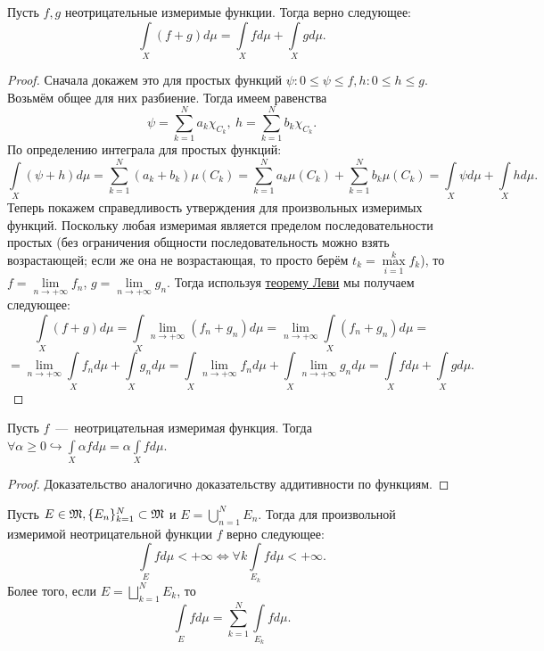 \begin{proposition}
    Пусть $f, g$ неотрицательные измеримые функции. Тогда верно следующее: \[\int\limits_X (f + g) d\mu = \int\limits_X fd\mu + \int\limits_X gd\mu.\]
\end{proposition}
\begin{proof}
    Сначала докажем это для простых функций $\psi: 0 \leq \psi \leq f, h: 0 \leq h \leq g$. Возьмём общее для них разбиение. Тогда имеем равенства \[\psi = \sum\limits_{k = 1}^N a_k \chi_{C_k}, \ h = \sum\limits_{k = 1}^N b_k \chi_{C_k}.\]
    По определению интеграла для простых функций: \[\int\limits_X (\psi + h)d\mu = \sum\limits_{k = 1}^N (a_k + b_k)\mu(C_k) = \sum\limits_{k = 1}^N a_k\mu(C_k) + \sum\limits_{k = 1}^N b_k\mu(C_k) = \int\limits_X \psi d\mu + \int\limits_X h d\mu.\]
    Теперь покажем справедливость утверждения для произвольных измеримых функций. Поскольку любая измеримая является пределом последовательности простых (без ограничения общности последовательность можно взять возрастающей; если же она не возрастающая, то просто берём $t_k = \max\limits_{i = 1}^k f_k$), то $f = \lim\limits_{n\rightarrow +\infty} f_n$, $g = \lim\limits_{n \rightarrow +\infty} g_n$. Тогда используя \hyperlink{beppo_levi}{теорему Леви} мы получаем следующее:     
    \[\int\limits_X (f + g)d\mu = \int\limits_X \lim\limits_{n\rightarrow +\infty} (f_n + g_n) d\mu = \lim\limits_{n \rightarrow + \infty} \int\limits_X (f_n + g_n)d\mu = \]\[ = \lim\limits_{n\rightarrow +\infty} \int\limits_X f_nd\mu + \int\limits_X g_nd\mu = \int\limits_X \lim\limits_{n \rightarrow +\infty} f_nd\mu + \int\limits_X \lim\limits_{n \rightarrow +\infty} g_nd\mu = \int\limits_X fd\mu + \int\limits_X gd\mu.\]
\end{proof}
\begin{proposition}
    Пусть $f$~---~неотрицательная измеримая функция. Тогда $\forall \alpha \geq 0 \hookrightarrow \int\limits_X \alpha f d\mu = \alpha \int\limits_X fd\mu$.
\end{proposition}
\begin{proof}
    Доказательство аналогично доказательству аддитивности по функциям.
\end{proof}
\begin{proposition}
    Пусть $E \in \mathfrak{M}, \{E_n\}_{k = 1}^N \subset \mathfrak{M}$ и $E = \bigcup\limits_{n = 1}^N E_n$. Тогда для произвольной измеримой неотрицательной функции $f$ верно следующее: \[\int\limits_E fd\mu < +\infty \Longleftrightarrow \forall k \int\limits_{E_k} fd\mu < +\infty.\]
    Более того, если $E = \bigsqcup\limits_{k = 1}^N E_k$, то \[\int\limits_E fd\mu = \sum\limits_{k = 1}^N \int\limits_{E_k} fd\mu.\]
\end{proposition}
